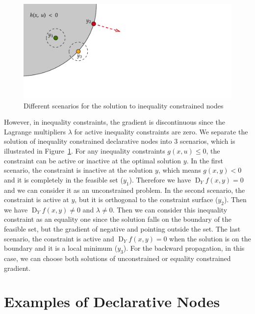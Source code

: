\begin{figure}
    \label{fig:regular-point}
    \centering
    \includegraphics[]{figs/non-regular-scenario.pdf}
    \caption{Different scenarios for the solution to inequality constrained nodes~\citep{SG:19}}
\end{figure}

\par However, in inequality constraints, the gradient is discontinuous since the Lagrange multipliers $\lambda$ for active inequality constraints are zero. We separate the solution of inequality constrained declarative nodes into 3 scenarios, which is illustrated in Figure~\ref{fig:regular-point}. For any inequality constraints $g(x, u) \leq 0$, the constraint can be active or inactive at the optimal solution $y$. In the first scenario, the constraint is inactive at the solution $y$, which means $g(x,y) < 0$ and it is completely in the feasible set ($y_1$). Therefore we have $\operatorname{D}_Yf(x,y) = 0$ and we can consider it as an unconstrained problem. In the second scenario, the constraint is active at $y$, but it is orthogonal to the constraint surface ($y_2$). Then we have $\operatorname{D}_Yf(x,y) \neq 0$ and $\lambda \neq 0$. Then we can consider this inequality constraint as an equality one since the solution falls on the boundary of the feasible set, but the gradient of negative and pointing outside the set. The last scenario, the constraint is active and $\operatorname{D}_Yf(x,y) = 0$ when the solution is on the boundary and it is a local minimum ($y_3$). For the backward propagation, in this case, we can choose both solutions of unconstrained or equality constrained gradient. 

\section{Examples of Declarative Nodes}
\label{sec:example}
